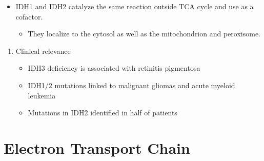 \documentclass{scrartcl}
\begin{document}

\begin{itemize}
\item IDH1 and IDH2 catalyze the same reaction outside TCA cycle and use  as a cofactor.
\begin{itemize}
\item They localize to the cytosol as well as the mitochondrion and peroxisome.
\end{itemize}
\end{itemize}


\begin{enumerate}
\item Clinical relevance
\label{sec:org6cd1314}
\begin{itemize}
\item IDH3 deficiency is associated with retinitis pigmentosa
\item IDH1/2 mutations linked to malignant gliomas and acute myeloid leukemia
\item Mutations in IDH2 identified in half of patients
\end{itemize}
\end{enumerate}
\section{Electron Transport Chain}
\label{sec:org67e09b4}
\end{document}
